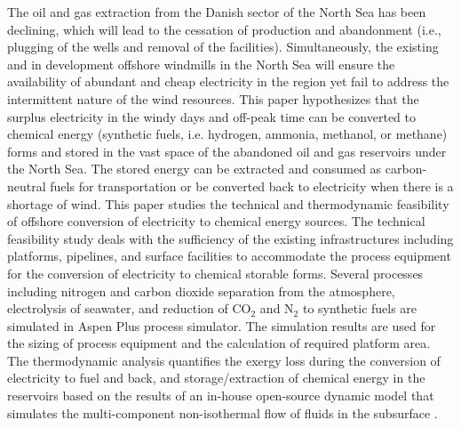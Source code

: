 \documentclass{ECOS_2021}
\begin{document}
The oil and gas extraction from the Danish sector of the North Sea
has been declining, which will lead to the cessation of production
and abandonment (i.e., plugging of the wells and removal of the facilities).
Simultaneously, the existing and in development offshore windmills
in the North Sea will ensure the availability of abundant and cheap
electricity in the region yet fail to address the intermittent nature
of the wind resources. This paper hypothesizes that the surplus electricity
in the windy days and off-peak time can be converted to chemical energy
(synthetic fuels, i.e. hydrogen, ammonia, methanol, or methane) forms
and stored in the vast space of the abandoned oil and gas reservoirs
under the North Sea. The stored energy can be extracted and consumed
as carbon-neutral fuels for transportation or be converted back to
electricity when there is a shortage of wind. This paper studies the
technical and thermodynamic feasibility of offshore conversion of
electricity to chemical energy sources. The technical feasibility
study deals with the sufficiency of the existing infrastructures including
platforms, pipelines, and surface facilities to accommodate the process
equipment for the conversion of electricity to chemical storable forms.
Several processes including nitrogen and carbon dioxide separation
from the atmosphere, electrolysis of seawater, and reduction of CO$_{2}$
and N$_{2}$ to synthetic fuels are simulated in Aspen Plus process
simulator. The simulation results are used for the sizing of process
equipment and the calculation of required platform area. The thermodynamic
analysis quantifies the exergy loss during the conversion of electricity
to fuel and back, and storage/extraction of chemical energy in the
reservoirs based on the results of an in-house open-source dynamic
model that simulates the multi-component non-isothermal flow of fluids
in the subsurface \cite{eftekhariFVToolFiniteVolume2015b}.
\end{document}
